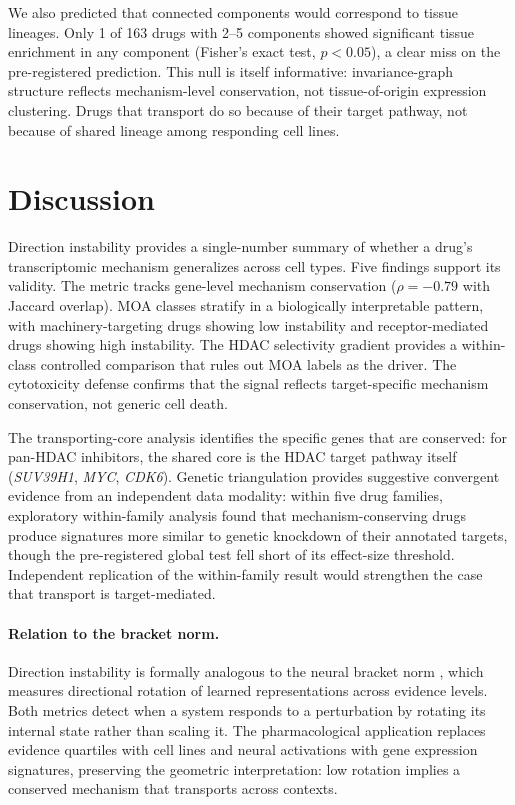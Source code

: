\documentclass{article}
\begin{document}
We also predicted that connected components would correspond to
tissue lineages. Only 1 of 163 drugs with 2--5 components showed
significant tissue enrichment in any component (Fisher's exact test,
$p < 0.05$), a clear miss on the pre-registered prediction.
This null is itself informative: invariance-graph structure reflects
mechanism-level conservation, not tissue-of-origin expression
clustering. Drugs that transport do so because of their target
pathway, not because of shared lineage among responding cell lines.

\section{Discussion}

Direction instability provides a single-number summary of whether a drug's
transcriptomic mechanism generalizes across cell types. Five findings
support its validity. The metric tracks gene-level mechanism conservation
($\rho = -0.79$ with Jaccard overlap). MOA classes stratify in a
biologically interpretable pattern, with machinery-targeting drugs
showing low instability and receptor-mediated drugs showing high
instability. The HDAC selectivity gradient provides a within-class
controlled comparison that rules out MOA labels as the driver. The
cytotoxicity defense confirms that the signal reflects target-specific
mechanism conservation, not generic cell death.

The transporting-core analysis identifies the specific genes that
are conserved: for pan-HDAC inhibitors, the shared core is the HDAC
target pathway itself (\emph{SUV39H1}, \emph{MYC}, \emph{CDK6}).
Genetic triangulation provides suggestive convergent evidence from an
independent data modality: within five drug families, exploratory
within-family analysis found that mechanism-conserving drugs produce
signatures more similar to genetic knockdown of their annotated targets,
though the pre-registered global test fell short of its effect-size
threshold. Independent replication of the within-family result would
strengthen the case that transport is target-mediated.

\paragraph{Relation to the bracket norm.}
Direction instability is formally analogous to the neural bracket norm
\citep{tower2026bracket}, which measures directional rotation of
learned representations across evidence levels. Both metrics detect when a
system responds to a perturbation by rotating its internal state rather
than scaling it. The pharmacological application replaces evidence
quartiles with cell lines and neural activations with gene expression
signatures, preserving the geometric interpretation: low rotation implies
a conserved mechanism that transports across contexts.
\end{document}
